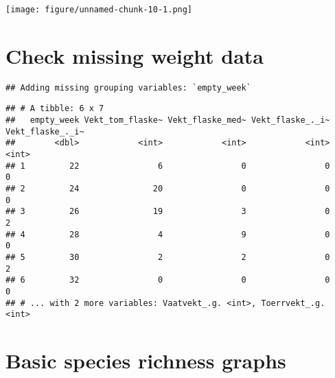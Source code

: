\documentclass[]{article}
\newenvironment{Shaded}{\begin{snugshade}}{\end{snugshade}}
\newcommand{\KeywordTok}[1]{\textcolor[rgb]{0.13,0.29,0.53}{\textbf{#1}}}
\newcommand{\NormalTok}[1]{#1}
\newcommand{\OperatorTok}[1]{\textcolor[rgb]{0.81,0.36,0.00}{\textbf{#1}}}
\newcommand{\StringTok}[1]{\textcolor[rgb]{0.31,0.60,0.02}{#1}}
\begin{document}
\texttt{[image: figure/unnamed-chunk-10-1.png]}

\hypertarget{check-missing-weight-data}{%
\section{Check missing weight data}\label{check-missing-weight-data}}

\begin{Shaded}
\end{Shaded}

\begin{verbatim}
## Adding missing grouping variables: `empty_week`
\end{verbatim}

\begin{verbatim}
## # A tibble: 6 x 7
##   empty_week Vekt_tom_flaske~ Vekt_flaske_med~ Vekt_flaske_._i~ Vekt_flaske_._i~
##        <dbl>            <int>            <int>            <int>            <int>
## 1         22                6                0                0                0
## 2         24               20                0                0                0
## 3         26               19                3                0                2
## 4         28                4                9                0                0
## 5         30                2                2                0                2
## 6         32                0                0                0                0
## # ... with 2 more variables: Vaatvekt_.g. <int>, Toerrvekt_.g. <int>
\end{verbatim}

\hypertarget{basic-species-richness-graphs}{%
\section{Basic species richness
graphs}\label{basic-species-richness-graphs}}
\end{document}

